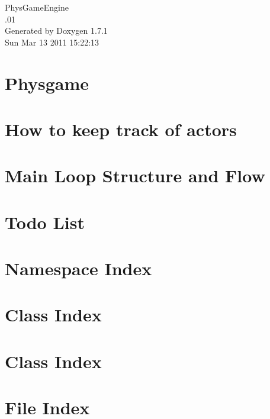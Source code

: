 \documentclass[a4paper]{book}
\begin{document}
\hypersetup{pageanchor=false}
\begin{titlepage}
\vspace*{7cm}
\begin{center}
{\Large PhysGameEngine \\[1ex]\large .01 }\\
\vspace*{1cm}
{\large Generated by Doxygen 1.7.1}\\
\vspace*{0.5cm}
{\small Sun Mar 13 2011 15:22:13}\\
\end{center}
\end{titlepage}
\clearemptydoublepage
{}
\tableofcontents
\clearemptydoublepage
{}
\hypersetup{pageanchor=true}
\chapter{Physgame}
\label{index}\hypertarget{index}{}
\chapter{How to keep track of actors}
\label{actorcontainer1}
\hypertarget{actorcontainer1}{}

\chapter{Main Loop Structure and Flow}
\label{mainloop1}
\hypertarget{mainloop1}{}

\chapter{Todo List}
\label{todo}
\hypertarget{todo}{}

\chapter{Namespace Index}

\chapter{Class Index}

\chapter{Class Index}

\chapter{File Index}

\end{document}
